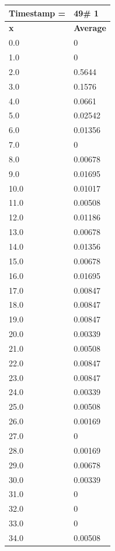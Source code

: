 \begin{tabular}{|l||l|}
\hline
\textbf{Timestamp =} & \textbf{49}\# 1\\\hline
	\textbf{x} & \textbf{Average} \\ \hline
\hline
	0.0 & 0 \\ \hline
	1.0 & 0 \\ \hline
	2.0 & 0.5644 \\ \hline
	3.0 & 0.1576 \\ \hline
	4.0 & 0.0661 \\ \hline
	5.0 & 0.02542 \\ \hline
	6.0 & 0.01356 \\ \hline
	7.0 & 0 \\ \hline
	8.0 & 0.00678 \\ \hline
	9.0 & 0.01695 \\ \hline
	10.0 & 0.01017 \\ \hline
	11.0 & 0.00508 \\ \hline
	12.0 & 0.01186 \\ \hline
	13.0 & 0.00678 \\ \hline
	14.0 & 0.01356 \\ \hline
	15.0 & 0.00678 \\ \hline
	16.0 & 0.01695 \\ \hline
	17.0 & 0.00847 \\ \hline
	18.0 & 0.00847 \\ \hline
	19.0 & 0.00847 \\ \hline
	20.0 & 0.00339 \\ \hline
	21.0 & 0.00508 \\ \hline
	22.0 & 0.00847 \\ \hline
	23.0 & 0.00847 \\ \hline
	24.0 & 0.00339 \\ \hline
	25.0 & 0.00508 \\ \hline
	26.0 & 0.00169 \\ \hline
	27.0 & 0 \\ \hline
	28.0 & 0.00169 \\ \hline
	29.0 & 0.00678 \\ \hline
	30.0 & 0.00339 \\ \hline
	31.0 & 0 \\ \hline
	32.0 & 0 \\ \hline
	33.0 & 0 \\ \hline
	34.0 & 0.00508 \\ \hline
\end{tabular}


